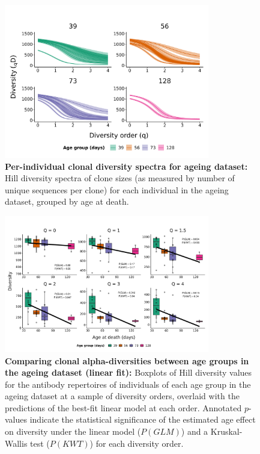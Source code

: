 \begin{figure}
\centering
\includegraphics[width = 0.8\textwidth]{_Figures/png/ageing-clone-diversity-solo-spectra}
\caption[Per-individual clonal diversity spectra for ageing dataset]{\textbf{Per-individual clonal diversity spectra for ageing dataset:} Hill diversity spectra of clone sizes (as measured by number of unique sequences per clone) for each individual in the \igseq ageing dataset, grouped by age at death.}
\label{fig:igseq-ageing-clone-diversity-solo-spectra}
\end{figure}

\begin{figure}
\centering
\includegraphics[width = 0.8\textwidth]{_Figures/png/ageing-clone-diversity-solo-fit-linear}
\caption[Comparing clonal alpha-diversities between age groups in the \igseq ageing dataset (linear fit)]{\textbf{Comparing clonal alpha-diversities between age groups in the \igseq ageing dataset (linear fit):} Boxplots of Hill diversity values for the antibody repertoires of individuals of each age group in the \igseq ageing dataset at a sample of diversity orders, overlaid with the predictions of the best-fit linear model at each order.  Annotated $p$-values indicate the statistical significance of the estimated age effect on diversity under the linear model ($P(GLM)$) and a Kruskal-Wallis test ($P(KWT)$) for each diversity order.}
\label{fig:igseq-ageing-clone-diversity-solo-fit-linear}
\end{figure}

